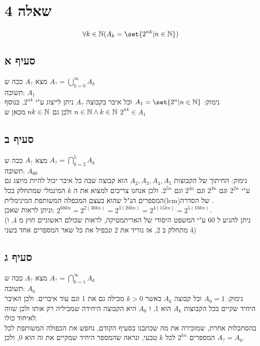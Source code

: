 \documentclass{article}
\DeclarePairedDelimiter\set\{\}
\begin{document}
	\pagebreak
	\section*{שאלה 4}
		\[\forall k \in \NN (A_k = \set{2^{nk} | n \in \NN}) \]
		\subsection*{סעיף א}
		מצא $A_?$ ככה ש
		$A_? = \bigcup_{k = 0}^{\infty}A_k$ \\
		תשובה: $A_1$ \\
	נימוק: $A_1 = \set{2^n | n \in \NN}$ וכל איבר בקבוצה $A_?$ ניתן לייצוג ע"י $2^{nk}$, בנוסף $n \in \mathbb{N} \land k \in \mathbb{N}$  ולכן גם $nk \in \mathbb{N}$ מכאן ש $2^{nk} \in A_1$

	\subsection*{סעיף ב}
	מצא $A_?$ ככה ש $A_? = \bigcap_{k=2}^{5}A_k$ \\
תשובה: $A_{60}$ \\
נימוק: החיתוך של הקבוצות $A_2, A_3, A_4, A_5$ הוא קבוצה שבה כל איבר יכול להיות מיוצג גם ע"י $2^{2n}$ וגם $2^{3n}$ וגם $2^{4n}$ וגם $2^{5n}$.
ולכן אנחנו צריכים למצוא את ה $k$ המינמלי שמתחלק בכל המספרים הנ"ל שהוא בעצם המכפלה המשותפת המינימלית(lcm)של הסדרה  .\\
וניתן לראות שאכן: $2^{60kn} = 2^{2(30kn)} = 2^{3(20kn)} = 2^{4(15kn)} = 2^{5(10kn)}$. \\
(ניתן להגיע ל 60 ע"י המשפט היסודי של האריתמטיקה, לראות שכולם ראשוניים חוץ מ 4, ו 4 מתחלק ב 2, אז נוריד את 2 ונכפיל את כל שאר המספרים אחד בשני)

\subsection*{סעיף ג}
מצא $A_?$ ככה ש
$A_? = \bigcap_{k = 1}^{\infty}A_k$ \\
תשובה: $A_0$ \\
נימוק: $A_0 = {1}$ וכל קבוצה $A_k$ כאשר $k > 0$ מכילה גם את 1 וגם עוד איברים.
ולכן האיבר היחיד שקיים בכל הקבוצות $A_k$ הוא 1, ו $A_0$ היא הקבוצה היחידה שמכיליה רק אותו ולכן שווה לאיחוד כולו. \\
בהסתכלות אחרת, שמזכירה את מה שכתבנו בסעיף הקודם, נחפש את הכפולה המשותפת לכל המספרים $2^{kn}$ לכל $k$ טבעי, ונראה שהמספר היחיד שמקיים את זה הוא 0, ולכן $A_? = A_0$.
\end{document}
